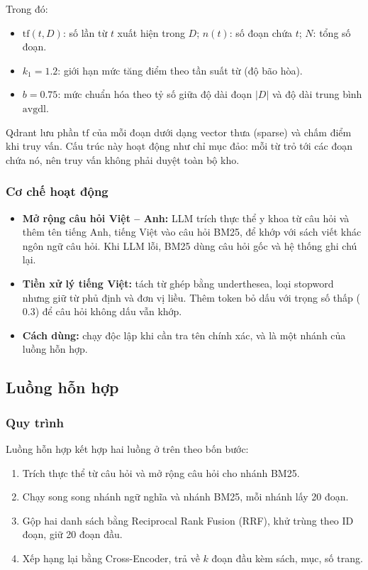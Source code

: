 Trong đó:
\begin{itemize}
  \item $\mathrm{tf}(t,D)$: số lần từ $t$ xuất hiện trong $D$; $n(t)$: số đoạn chứa $t$; $N$: tổng số đoạn.
  \item $k_1=1.2$: giới hạn mức tăng điểm theo tần suất từ (độ bão hòa).
  \item $b=0.75$: mức chuẩn hóa theo tỷ số giữa độ dài đoạn $|D|$ và độ dài trung bình $\mathrm{avgdl}$.
\end{itemize}

Qdrant lưu phần $\mathrm{tf}$ của mỗi đoạn dưới dạng vector thưa (sparse) và chấm điểm khi truy vấn. Cấu trúc này hoạt động như chỉ mục đảo: mỗi từ trỏ tới các đoạn chứa nó, nên truy vấn không phải duyệt toàn bộ kho.

\subsubsection{Cơ chế hoạt động}

\begin{itemize}
  \item \textbf{Mở rộng câu hỏi Việt -- Anh:} LLM trích thực thể y khoa từ câu hỏi và thêm tên tiếng Anh, tiếng Việt vào câu hỏi BM25, để khớp với sách viết khác ngôn ngữ câu hỏi. Khi LLM lỗi, BM25 dùng câu hỏi gốc và hệ thống ghi chú lại.
  \item \textbf{Tiền xử lý tiếng Việt:} tách từ ghép bằng underthesea, loại stopword nhưng giữ từ phủ định và đơn vị liều. Thêm token bỏ dấu với trọng số thấp ($0.3$) để câu hỏi không dấu vẫn khớp.
  \item \textbf{Cách dùng:} chạy độc lập khi cần tra tên chính xác, và là một nhánh của luồng hỗn hợp.
\end{itemize}

\subsection{Luồng hỗn hợp}

\subsubsection{Quy trình}

Luồng hỗn hợp kết hợp hai luồng ở trên theo bốn bước:
\begin{enumerate}
  \item Trích thực thể từ câu hỏi và mở rộng câu hỏi cho nhánh BM25.
  \item Chạy song song nhánh ngữ nghĩa và nhánh BM25, mỗi nhánh lấy 20 đoạn.
  \item Gộp hai danh sách bằng Reciprocal Rank Fusion (RRF), khử trùng theo ID đoạn, giữ 20 đoạn đầu.
  \item Xếp hạng lại bằng Cross-Encoder, trả về $k$ đoạn đầu kèm sách, mục, số trang.
\end{enumerate}

